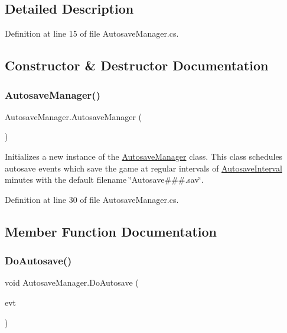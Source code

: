 \subsection{Detailed Description}


Definition at line 15 of file Autosave\+Manager.\+cs.



\subsection{Constructor \& Destructor Documentation}
\mbox{\label{class_autosave_manager_a9856885198573cc21eec3034d77bc50e}} 
\subsubsection{\texorpdfstring{Autosave\+Manager()}{AutosaveManager()}}
{\footnotesize\ttfamily Autosave\+Manager.\+Autosave\+Manager (\begin{DoxyParamCaption}{ }\end{DoxyParamCaption})}



Initializes a new instance of the \hyperlink{class_autosave_manager}{Autosave\+Manager} class. This class schedules autosave events which save the game at regular intervals of \hyperlink{class_autosave_manager_aa499ab2fe041ef5134db38b40404329f}{Autosave\+Interval} minutes with the default filename \char`\"{}\+Autosave\#\#\#.\+sav\char`\"{}. 



Definition at line 30 of file Autosave\+Manager.\+cs.



\subsection{Member Function Documentation}
\mbox{\label{class_autosave_manager_a1380021fcada31aa86065ff956d113ae}} 
\subsubsection{\texorpdfstring{Do\+Autosave()}{DoAutosave()}}
{\footnotesize\ttfamily void Autosave\+Manager.\+Do\+Autosave (\begin{DoxyParamCaption}\item[{\hyperlink{class_scheduler_1_1_scheduled_event}{Scheduled\+Event}}]{evt }\end{DoxyParamCaption})}



